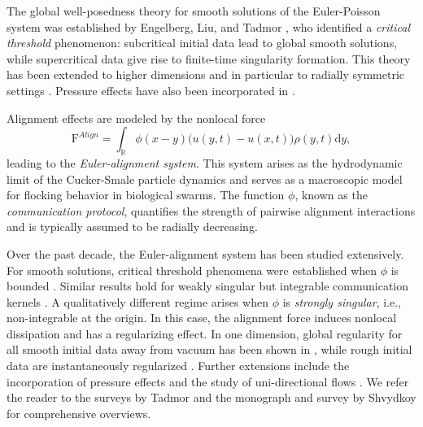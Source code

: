 \documentclass[11pt,reqno]{amsart}
\theoremstyle{definition}
\theoremstyle{remark}
\def\R{\mathbb{R}}
\def\dd{\mathrm{d}}
\def\F{\mathrm{F}}
\begin{document}
	The global well-posedness theory for smooth solutions of the Euler-Poisson system was established by Engelberg, Liu, and Tadmor \cite{engelberg2001critical}, who identified a \emph{critical threshold} phenomenon: subcritical initial data lead to global smooth solutions, while supercritical data give rise to finite-time singularity formation. This theory has been extended to higher dimensions \cite{tadmor2003critical} and in particular to radially symmetric settings \cite{wei2012critical,tan2021eulerian,carrillo2023existence}.  Pressure effects have also been incorporated in \cite{tadmor2008global}.
	
	Alignment effects are modeled by the nonlocal force
	\[
	\F^{Align} = \int_\R \phi(x-y)\big(u(y,t)-u(x,t)\big)\rho(y,t)\dd y,
	\]
	leading to the \emph{Euler-alignment system}. This system arises as the hydrodynamic limit of the Cucker-Smale particle dynamics \cite{cucker2007emergent} and serves as a macroscopic model for flocking behavior in biological swarms. The function $\phi$, known as the \emph{communication protocol}, quantifies the strength of pairwise alignment interactions and is typically assumed to be radially decreasing.
	
	Over the past decade, the Euler-alignment system has been studied extensively. For smooth solutions, critical threshold phenomena were established when $\phi$ is bounded \cite{tadmor2014critical,carrillo2016critical,he2017global}. Similar results hold for weakly singular but integrable communication kernels \cite{tan2020euler,leslie2020lagrangian}. A qualitatively different regime arises when $\phi$ is \emph{strongly singular}, i.e., non-integrable at the origin. In this case, the alignment force induces nonlocal dissipation and has a regularizing effect. In one dimension, global regularity for all smooth initial data away from vacuum has been shown in \cite{do2018global,kiselev2018global,shvydkoy2017eulerian,shvydkoy2017eulerian2,shvydkoy2018eulerian}, while rough initial data are instantaneously regularized \cite{danchin2019regular,leslie2018weak}.
	Further extensions include the incorporation of pressure effects \cite{choi2019global,chen2021global,tadmor2023swarming,bai2024global,bai2024global2} and the study of uni-directional flows \cite{LLST2020geometric,lear2021unidirectional,lear2022existence,li2024global}. We refer the reader to the surveys by Tadmor \cite{tadmor2021mathematics,tadmor2023swarming} and the monograph \cite{shvydkoy2021dynamics} and survey \cite{ShvydkoySurvey} by Shvydkoy for comprehensive overviews.
	
\end{document}
